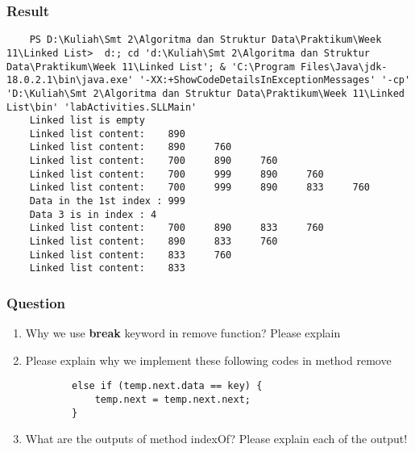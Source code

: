 \documentclass[12pt,titlepage]{article}
\begin{document}
\subsubsection{Result}
\begin{verbatim}
    PS D:\Kuliah\Smt 2\Algoritma dan Struktur Data\Praktikum\Week 11\Linked List>  d:; cd 'd:\Kuliah\Smt 2\Algoritma dan Struktur Data\Praktikum\Week 11\Linked List'; & 'C:\Program Files\Java\jdk-18.0.2.1\bin\java.exe' '-XX:+ShowCodeDetailsInExceptionMessages' '-cp' 'D:\Kuliah\Smt 2\Algoritma dan Struktur Data\Praktikum\Week 11\Linked List\bin' 'labActivities.SLLMain' 
    Linked list is empty
    Linked list content:    890
    Linked list content:    890     760
    Linked list content:    700     890     760
    Linked list content:    700     999     890     760
    Linked list content:    700     999     890     833     760
    Data in the 1st index : 999
    Data 3 is in index : 4
    Linked list content:    700     890     833     760
    Linked list content:    890     833     760
    Linked list content:    833     760
    Linked list content:    833
\end{verbatim}

\subsubsection{Question}
\begin{enumerate}
    \item Why we use \textbf{break} keyword in remove function? Please explain
    \item Please explain why we implement these following codes in method remove
    \begin{verbatim}
        else if (temp.next.data == key) {
            temp.next = temp.next.next;
        }
    \end{verbatim}
    \item What are the outputs of method indexOf? Please explain each of the output!
\end{enumerate}
\end{document}
